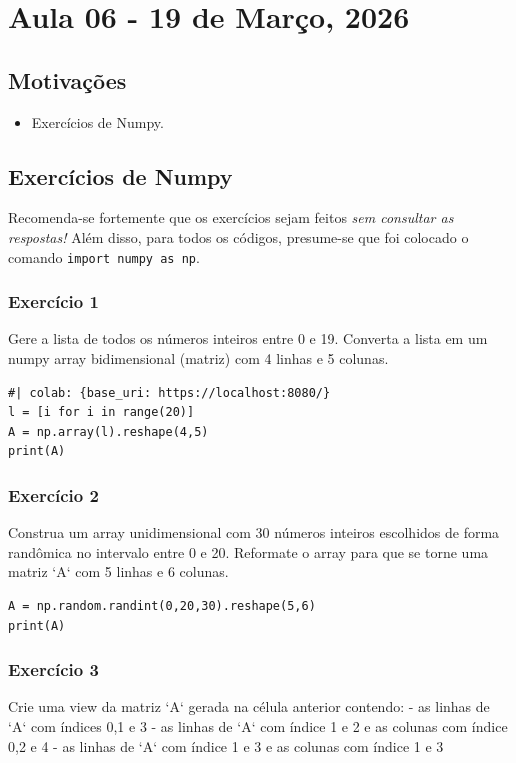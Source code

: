 \documentclass[../numerical_methods.tex]{subfiles}
\begin{document}
\section{Aula 06 - 19 de Março, 2026}
\subsection{Motivações}
\begin{itemize}
	\item Exercícios de Numpy.
\end{itemize}
\subsection{Exercícios de Numpy}
Recomenda-se fortemente que os exercícios sejam feitos \textit{sem consultar as respostas!} Além disso, para todos os códigos, presume-se que foi colocado o comando \texttt{import numpy as np}.
\subsubsection{Exercício 1}
Gere a lista de todos os números inteiros entre 0 e 19. Converta a lista em um numpy array bidimensional (matriz) com 4 linhas e 5 colunas.

\begin{verbatim}
#| colab: {base_uri: https://localhost:8080/}
l = [i for i in range(20)]
A = np.array(l).reshape(4,5)
print(A)
\end{verbatim}


\subsubsection{Exercício 2}
Construa um array unidimensional com 30 números inteiros escolhidos de forma randômica no intervalo entre 0 e 20. Reformate o array para que se torne uma matriz `A` com 5 linhas e 6 colunas.

\begin{verbatim}
A = np.random.randint(0,20,30).reshape(5,6)
print(A)
\end{verbatim}


\subsubsection{Exercício 3}
Crie uma view da matriz `A` gerada na célula anterior contendo:
- as linhas de `A` com índices 0,1 e 3
- as linhas de `A` com índice 1 e 2 e as colunas com índice 0,2 e 4
- as linhas de `A` com índice 1 e 3 e as colunas com índice 1 e 3
\end{document}
